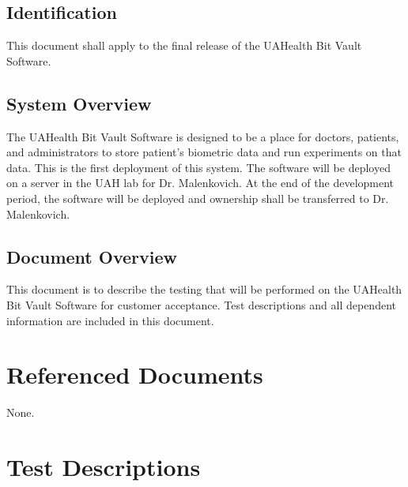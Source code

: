 \documentclass[letterpaper,10pt,english]{sphinxmanual}
\begin{document}
\subsection{Identification}
\label{STD/software_test_description:identification}
This document shall apply to the final release of the UAHealth Bit Vault Software.


\subsection{System Overview}
\label{STD/software_test_description:system-overview}
The UAHealth Bit Vault Software is designed to be a place for doctors, patients, and administrators to store patient’s
biometric data and run experiments on that data. This is the first deployment of this system.
The software will be deployed on a server in the UAH lab for Dr. Malenkovich. At the end of the development period,
the software will be deployed and ownership shall be transferred to Dr. Malenkovich.


\subsection{Document Overview}
\label{STD/software_test_description:document-overview}
This document is to describe the testing that will be performed on the UAHealth Bit Vault Software for customer acceptance.
Test descriptions and all dependent information are included in this document.


\section{Referenced Documents}
\label{STD/software_test_description:referenced-documents}
None.


\section{Test Descriptions}
\label{STD/software_test_description:test-descriptions}
\end{document}
